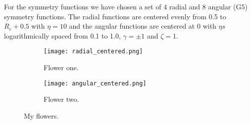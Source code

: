 For the symmetry functions we have chosen a set of 4 radial and 8 angular (G5)
symmetry functions. The radial functions are centered evenly from
0.5 to $R_c + 0.5$ with $\eta = 10$ and the angular functions
are centered at 0 with $\eta s$ logarithmically spaced from 0.1 to 1.0,
$\gamma = \pm 1$ and $\zeta = 1$.

\begin{figure}[!tbp]
\begin{adjustbox}{max width=1.2\linewidth,center}
\centering
  \begin{subfigure}[b]{0.55\textwidth}
      \texttt{[image: radial\_centered.png]}
    \caption{Flower one.}
    \label{fig:f1}
  \end{subfigure}
  \hfill
  \begin{subfigure}[b]{0.55\textwidth}
      \texttt{[image: angular\_centered.png]}
    \caption{Flower two.}
    \label{fig:f2}
  \end{subfigure}
\end{adjustbox}
\caption{My flowers.}
\end{figure}

